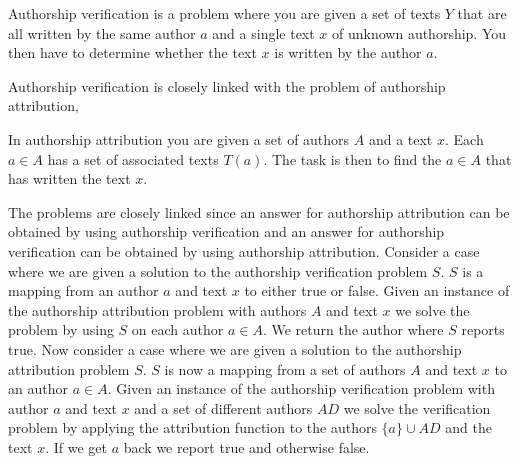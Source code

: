 \begin{definition}

    Authorship verification is a problem where you are given a set of texts $Y$
    that are all written by the same author $a$ and a single text $x$ of unknown
    authorship. You then have to determine whether the text $x$ is written by
    the author $a$.

\end{definition}

Authorship verification is closely linked with the problem of authorship
attribution,

\begin{definition}

    In authorship attribution you are given a set of authors $A$ and a text $x$.
    Each $a \in A$ has a set of associated texts $T(a)$. The task is then to
    find the $a \in A$ that has written the text $x$.

\end{definition}

The problems are closely linked since an answer for authorship attribution can
be obtained by using authorship verification and an answer for authorship
verification can be obtained by using authorship attribution. Consider a case
where we are given a solution to the authorship verification problem $S$. $S$ is
a mapping from an author $a$ and text $x$ to either true or false. Given an
instance of the authorship attribution problem with authors $A$ and text $x$ we
solve the problem by using $S$ on each author $a \in A$. We return the author
where $S$ reports true. Now consider a case where we are given a solution to the
authorship attribution problem $S$. $S$ is now a mapping from a set of authors
$A$ and text $x$ to an author $a \in A$. Given an instance of the authorship
verification problem with author $a$ and text $x$ and a set of different authors
$AD$ we solve the verification problem by applying the attribution function to
the authors $\{a\} \cup AD$ and the text $x$. If we get $a$ back we report
true and otherwise false.

